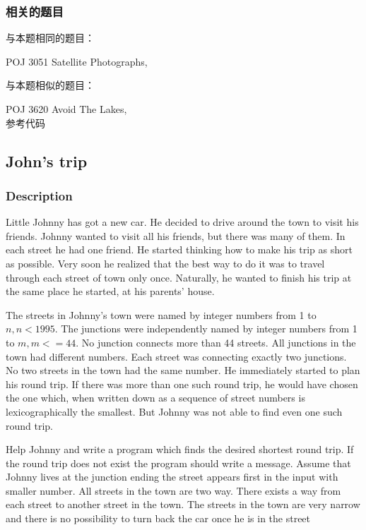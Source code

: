 \subsubsection{相关的题目}
与本题相同的题目：
\begindot
\item POJ 3051 Satellite Photographs, 
\myenddot

与本题相似的题目：
\begindot
\item POJ 3620 Avoid The Lakes,  \\ 参考代码 
\myenddot


\subsection{John's trip}


\subsubsection{Description}
Little Johnny has got a new car. He decided to drive around the town to visit his friends. Johnny wanted to visit all his friends, but there was many of them. In each street he had one friend. He started thinking how to make his trip as short as possible. Very soon he realized that the best way to do it was to travel through each street of town only once. Naturally, he wanted to finish his trip at the same place he started, at his parents' house. 

The streets in Johnny's town were named by integer numbers from 1 to $n, n < 1995$. The junctions were independently named by integer numbers from 1 to $m, m <= 44$. No junction connects more than 44 streets. All junctions in the town had different numbers. Each street was connecting exactly two junctions. No two streets in the town had the same number. He immediately started to plan his round trip. If there was more than one such round trip, he would have chosen the one which, when written down as a sequence of street numbers is lexicographically the smallest. But Johnny was not able to find even one such round trip. 

Help Johnny and write a program which finds the desired shortest round trip. If the round trip does not exist the program should write a message. Assume that Johnny lives at the junction ending the street appears first in the input with smaller number. All streets in the town are two way. There exists a way from each street to another street in the town. The streets in the town are very narrow and there is no possibility to turn back the car once he is in the street 


